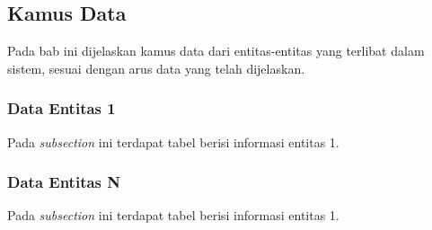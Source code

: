   
  \subsection{Kamus Data}
  Pada bab ini dijelaskan kamus data dari entitas-entitas yang terlibat dalam sistem, sesuai dengan arus data yang telah dijelaskan.
 \subsubsection{Data Entitas 1}
 \indent Pada \textit{subsection} ini terdapat tabel berisi informasi entitas 1.
 \subsubsection{Data Entitas N}
 \indent Pada \textit{subsection} ini terdapat tabel berisi informasi entitas 1.
    
